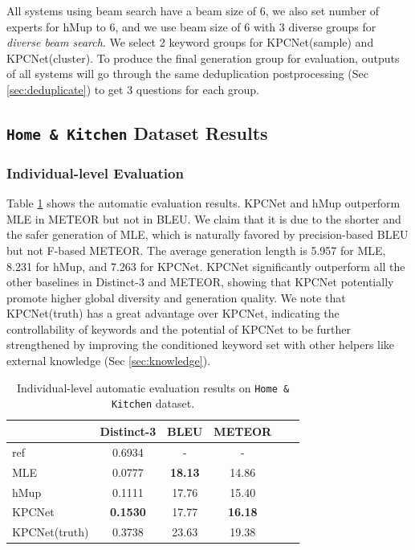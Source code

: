 All systems using beam search have a beam size of 6, we also set number of experts for hMup to 6, and we use beam size of 6 with 3 diverse groups for \textit{diverse beam search}. We select 2 keyword groups for KPCNet(sample) and KPCNet(cluster). To produce the final generation group for evaluation, outputs of all systems will go through the same deduplication postprocessing (Sec \ref{sec:deduplicate}) to get 3 questions for each group.

\subsection{\texttt{Home \& Kitchen} Dataset Results}

\subsubsection{Individual-level Evaluation}

Table \ref{tab:ind-auto-eval} shows the automatic evaluation results. KPCNet and hMup outperform MLE in METEOR but not in BLEU. We claim that it is due to the shorter and the safer generation of MLE, which is naturally favored by precision-based BLEU but not F-based METEOR. The average generation length is 5.957 for MLE, 8.231 for hMup, and 7.263 for KPCNet. KPCNet significantly outperform all the other baselines in Distinct-3 and METEOR, showing that KPCNet potentially promote higher global diversity and generation quality. We note that KPCNet(truth) has a great advantage over KPCNet, indicating the controllability of keywords and the potential of KPCNet to be further strengthened by improving the conditioned keyword set with other helpers like external knowledge (Sec \ref{sec:knowledge}).

\begin{table}[h]
  \small
  \centering
  \begin{tabular}{l|ccccc}
  \hline
  {} & Distinct-3 & BLEU & METEOR \\
  \hline
  ref  &        0.6934 &        - &    - \\
  \hline
  MLE &        0.0777 &  \textbf{18.13} & 14.86 \\
  hMup &        0.1111 &  17.76 &    15.40  \\
  KPCNet &        \textbf{0.1530} &     17.77 &    \textbf{16.18}  \\
  \hline
  KPCNet(truth) &        0.3738 &     23.63 &    19.38  \\
  \hline
  \end{tabular}
  \caption{\label{tab:ind-auto-eval} Individual-level automatic evaluation results on \texttt{Home \& Kitchen} dataset.}
\end{table}

